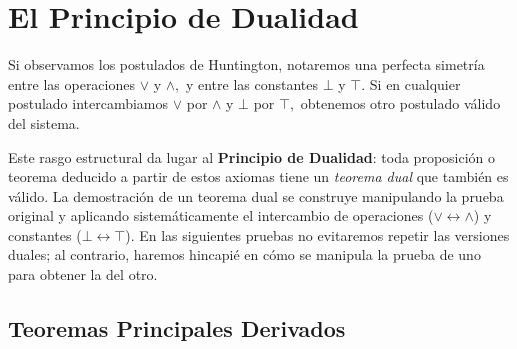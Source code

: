 \chapter{El Principio de Dualidad}
Si observamos los postulados de Huntington, notaremos una perfecta simetría entre las operaciones $\vee$ y $\wedge,$ y entre las constantes $\bot$ y $\top.$ Si en cualquier postulado intercambiamos $\vee$ por $\wedge$ y $\bot$ por $\top,$ obtenemos otro postulado válido del sistema. 

Este rasgo estructural da lugar al \textbf{Principio de Dualidad}: toda proposición o teorema deducido a partir de estos axiomas tiene un \textit{teorema dual} que también es válido. La demostración de un teorema dual se construye manipulando la prueba original y aplicando sistemáticamente el intercambio de operaciones ($\vee \leftrightarrow \wedge$) y constantes ($\bot \leftrightarrow \top$). En las siguientes pruebas no evitaremos repetir las versiones duales; al contrario, haremos hincapié en cómo se manipula la prueba de uno para obtener la del otro.

\section{Teoremas Principales Derivados}

